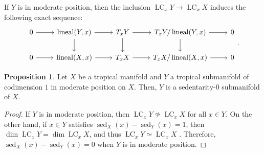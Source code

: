 \documentclass[a4paper,dvipdfmx,reqno,12pt]{amsart}
\theoremstyle{definition}
\newtheorem{proposition}[theorem]{Proposition}
\newcommand{\opn}[1]{\operatorname{#1}}
\numberwithin{equation}{section}
\begin{document}
If $Y$ is in moderate position, then
the inclusion 
$\opn{LC}_x Y\to \opn{LC}_x X$ induces the following 
exact sequence:
\[\begin{tikzcd}
	0 & {\opn{lineal}(Y,x)} & {T_x Y} & {T_x Y/\opn{lineal}(Y,x)} & 0 \\
	0 & {\opn{lineal}(X,x)} & {T_x X} & 
{T_x X/\opn{lineal}(X,x)} & 0
	\arrow[from=1-1, to=1-2]
	\arrow[from=2-1, to=2-2]
	\arrow[from=2-3, to=2-4]
	\arrow[from=1-3, to=1-4]
	\arrow[from=1-4, to=2-4]
	\arrow[from=1-2, to=2-2]
	\arrow[from=1-2, to=1-3]
	\arrow[from=2-2, to=2-3]
	\arrow[from=1-3, to=2-3]
	\arrow[from=2-4, to=2-5]
	\arrow[from=1-4, to=1-5]
\end{tikzcd}.\]

\begin{proposition}
Let $X$ be a tropical manifold and 
$Y$ a tropical submanifold of codimension $1$
in moderate position on $X$.
Then, $Y$ is a sedentarity-0 submanifold of $X$.
\end{proposition}
\begin{proof}
If $Y$ is in moderate position,
then $\opn{LC}_x Y\not \simeq \opn{LC}_x X$ for all 
$x \in Y$.
On the other hand, if $x \in Y$ satisfies 
$\opn{sed}_X(x)-\opn{sed}_Y(x)=1$, then
$\dim \opn{LC}_x Y=\dim \opn{LC}_x X$,
and thus $\opn{LC}_x Y\simeq \opn{LC}_x X$
\cite[Lemma 2.4]{MR3041763}.
Therefore, $\opn{sed}_X(x)-\opn{sed}_Y(x)=0$ when
$Y$ is in moderate position. 
\end{proof}
\end{document}
